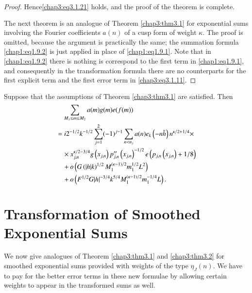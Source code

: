 \begin{proof}
Hence\pageoriginale \eqref{chap3:eq3.1.21} holds, and the proof of the
theorem is complete.

The next theorem is an analogue of Theorem \ref{chap3:thm3.1} for
exponential sums involving the Fourier coefficients $a(n)$ of a cusp
form of weight $\kappa$. The proof is omitted, because the argument is
practically the same; the summation formula \eqref{chap1:eq1.9.2} is
just applied in place of \eqref{chap1:eq1.9.1}. Note that in
\eqref{chap1:eq1.9.2} there is nothing is correspond to the first term
in \eqref{chap1:eq1.9.1}, and consequently in the transformation
formula there are no counterparts for the first explicit term and the
first error term in \eqref{chap3:eq3.1.11}.
\end{proof}

\begin{thm}\label{chap3:thm3.2}
Suppose that the assumptions of Theorem \ref{chap3:thm3.1} are
satisfied. Then 
\begin{align}
&\quad \sum\limits_{M_1\leq m\leq
M_2}a(m)g(m)e(f(m))\label{chap3:eq3.1.41}\\
& = i2^{-1/2}k^{-1/2}\sum\limits_{j=1}^2(-1)^{j-1} \sum\limits_{n<n_j}
a(n)e_k\left(-n\bar{h}\right)n^{\kappa/2+1/4}\times\notag\\
&\quad \times x_{j,n}^{\kappa/2-3/4}g\left(x_{j,n}\right) p''_{j,n}
\left(x_{j,n}\right)^{-1/2}e\left(p_{j,n}\left(x_{j,n}\right)
+1/8\right)\notag\\
&\quad +o\left(G\left(|h|k\right)^{1/2}M_1^{(\kappa-1)/2}m_1^{1/2}L^2
\right)\notag\\
&\quad +o\left(F^{1/2}G|h|^{-3/4}k^{5/4}M_1^{(\kappa-1)/2}m_1^{-1/4}L
\right)\notag. 
\end{align}
\end{thm}

\section{Transformation of Smoothed Exponential
  Sums}\label{chap3:sec3.2}

We now give analogues of Theorem \ref{chap3:thm3.1} and
\ref{chap3:thm3.2} for smoothed exponential sums provided with weights
of the type $\eta_J(n)$. We have to pay for the better error terms in
these new formulae by allowing certain weights to appear in the
transformed sums as well.

